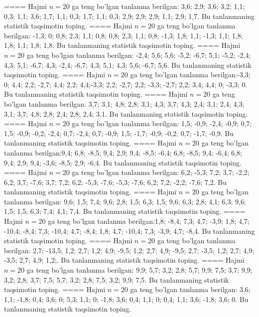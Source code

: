 ====
Hajmi \(n = 20\) ga teng bo'lgan tanlanma berilgan: 3,6; 2,9; 3,6; 3,2; 1,1; 0,3; 1,1; 3,6; 1,7; 1,1; 0,3; 1,7; 1,1; 0,3; 2,9; 2,9; 2,9; 1,1; 2,9; 1,7. Bu tanlanmaning statistik taqsimotin toping.
====
Hajmi \(n = 20\) ga teng bo'lgan tanlanma berilgan: -1,3; 0; 0,8; 2,3; 1,1; 0,8; 0,8; 2,3; 1,1; 0,8; -1,3; 1,8; 1,1; -1,3; 1,1; 1,8; 1,8; 1,1; 1,8; 1,8. Bu tanlanmaning statistik taqsimotin toping.
====
Hajmi \(n = 20\) ga teng bo'lgan tanlanma berilgan: -2,4; 5,6; 5,6; -5,2; -6,7; 5,1; -5,2; -2,4; 4,3; 5,1; -6,7; 4,3; -2,4; -6,7; 4,3; 5,1; 4,3; 5,6; -6,7; 5,6. Bu tanlanmaning statistik taqsimotin toping.
====
Hajmi \(n = 20\) ga teng bo'lgan tanlanma berilgan:-3,3; 0; 4,4; 2,2; -2,7; 4,4; 2,2; 4,4;-3,3; 2,2; -2,7; 2,2; -3,3; -2,7; 2,2; 3,4; 4,4; 0; -3,3; 0. Bu tanlanmaning statistik taqsimotin toping.
====
Hajmi \(n = 20\) ga teng bo'lgan tanlanma berilgan: 3,7; 3,1; 4,8; 2,8; 3,1; 4,3; 3,7; 4,3; 2,4; 3,1; 2,4; 4,3; 3,1; 3,7; 4,8; 2,8; 2,4; 2,8; 2,4; 3,1. Bu tanlanmaning statistik taqsimotin toping.
====
Hajmi \(n = 20\) ga teng bo'lgan tanlanma berilgan: 1,5; -0,9; -2,4; -0,9; 0,7; 1,5; -0,9; -0,2; -2,4; 0,7; -2,4; 0,7; -0,9; 1,5; -1,7; -0,9; -0,2; 0,7; -1,7; -0,9. Bu tanlanmaning statistik taqsimotin toping.
====
Hajmi \(n = 20\) ga teng bo'lgan tanlanma berilgan:9,4; 6,8; -8,5; 9,4; 2,9; 9,4; -8,5; -6,4; 6,8; -8,5; 9,4; -6,4; 6,8; 9,4; 2,9; 9,4; -3,6; -8,5; 2,9; -6,4. Bu tanlanmaning statistik taqsimotin toping.
====
Hajmi \(n = 20\) ga teng bo'lgan tanlanma berilgan: 6,2; -5,3; 7,2; 3,7; -2,2; 6,2; 3,7; -7,6; 3,7; 7,2; 6,2; -5,3; -7,6; -5,3; -7,6; 6,2; 7,2; -2,2; -7,6; 7,2. Bu tanlanmaning statistik taqsimotin toping.
====
Hajmi \(n = 20\) ga teng bo'lgan tanlanma berilgan: 9,6; 1,5; 7,4; 9,6; 2,8; 1,5; 6,3; 1,5; 9,6; 6,3; 2,8; 4,1; 6,3; 9,6; 1,5; 1,5; 6,3; 7,4; 4,1; 7,4. Bu tanlanmaning statistik taqsimotin toping.
====
Hajmi \(n = 20\) ga teng bo'lgan tanlanma berilgan:1,8; -8,4; 7,3; 4,7; -3,9; 1,8; 4,7; -10,4; -8,4; 7,3; -10,4; 4,7; -8,4; 1,8; 4,7; -10,4; 7,3; -3,9; 4,7; -8,4. Bu tanlanmaning statistik taqsimotin toping.
====
Hajmi \(n = 20\) ga teng bo'lgan tanlanma berilgan: 2,7; -13,5; 1,2; 2,7; 1,2; 4,9; -9,5; 1,2; 2,7; 4,9; -9,5; 2,7; -3,5; 1,2; 2,7; 4,9; -3,5; 2,7; 4,9; 1,2;. Bu tanlanmaning statistik taqsimotin toping.
====
Hajmi \(n = 20\) ga teng bo'lgan tanlanma berilgan: 9,9; 5,7; 3,2; 2,8; 5,7; 9,9; 7,5; 3,7; 9,9; 3,2; 2,8; 3,7; 7,5; 5,7; 3,2; 2,8; 7,5; 3,2; 9,9; 7,5. Bu tanlanmaning statistik taqsimotin toping.
====
Hajmi \(n = 20\) ga teng bo'lgan tanlanma berilgan: 3,6; 1,1; -1,8; 0,4; 3,6; 0; 5,3; 1,1; 0; -1,8; 3,6; 0,4; 1,1; 0; 0,4; 1,1; 3,6; -1,8; 3,6; 0. Bu tanlanmaning statistik taqsimotin toping.
